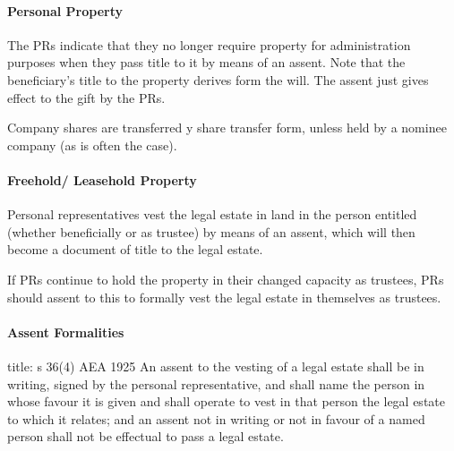 \documentclass[
]{article}
\newenvironment{Shaded}{}{}
\newcommand{\NormalTok}[1]{#1}
\begin{document}
\hypertarget{personal-property}{%
\paragraph{Personal Property}\label{personal-property}}

The PRs indicate that they no longer require property for administration
purposes when they pass title to it by means of an assent. Note that the
beneficiary's title to the property derives form the will. The assent
just gives effect to the gift by the PRs.

Company shares are transferred y share transfer form, unless held by a
nominee company (as is often the case).

\hypertarget{freehold-leasehold-property}{%
\paragraph{Freehold/ Leasehold
Property}\label{freehold-leasehold-property}}

Personal representatives vest the legal estate in land in the person
entitled (whether beneficially or as trustee) by means of an assent,
which will then become a document of title to the legal estate.

\begin{Shaded}
\begin{Highlighting}[]
\NormalTok{If PRs continue to hold the property in their changed capacity as trustees, PRs should \textquotesingle{}assent\textquotesingle{} to this to formally vest the legal estate in themselves as trustees. }
\end{Highlighting}
\end{Shaded}

\hypertarget{assent-formalities}{%
\paragraph{Assent Formalities}\label{assent-formalities}}

\begin{Shaded}
\begin{Highlighting}[]
\NormalTok{title: s 36(4) AEA 1925}
\NormalTok{An assent to the vesting of a legal estate shall be in writing, signed by the personal representative, and shall name the person in whose favour it is given and shall operate to vest in that person the legal estate to which it relates; and an assent not in writing or not in favour of a named person shall not be effectual to pass a legal estate.}
\end{Highlighting}
\end{Shaded}
\end{document}
